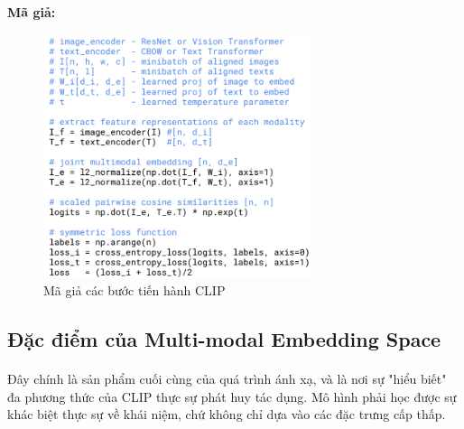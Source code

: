 \textbf{Mã giả:}
\begin{figure}[H]
\centering
    \includegraphics[width=0.7\textwidth]{img/03-pseudocode.png}
    \caption{Mã giả các bước tiến hành CLIP}
    \label{fig:pseudocode}
\end{figure}

\subsection{Đặc điểm của Multi-modal Embedding Space}
\paragraph{}{Đây chính là sản phẩm cuối cùng của quá trình ánh xạ, và là nơi sự "hiểu biết" đa phương thức của CLIP thực sự phát huy tác dụng. Mô hình phải học được sự khác biệt thực sự về khái niệm, chứ không chỉ dựa vào các đặc trưng cấp thấp.}

